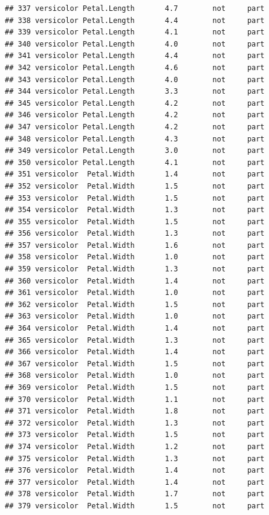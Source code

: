 \documentclass[krantz2]{krantz}\usepackage{knitr}%
\begin{document}
\begin{knitrout}
\begin{kframe}
\begin{verbatim}
## 337 versicolor Petal.Length       4.7        not     part
## 338 versicolor Petal.Length       4.4        not     part
## 339 versicolor Petal.Length       4.1        not     part
## 340 versicolor Petal.Length       4.0        not     part
## 341 versicolor Petal.Length       4.4        not     part
## 342 versicolor Petal.Length       4.6        not     part
## 343 versicolor Petal.Length       4.0        not     part
## 344 versicolor Petal.Length       3.3        not     part
## 345 versicolor Petal.Length       4.2        not     part
## 346 versicolor Petal.Length       4.2        not     part
## 347 versicolor Petal.Length       4.2        not     part
## 348 versicolor Petal.Length       4.3        not     part
## 349 versicolor Petal.Length       3.0        not     part
## 350 versicolor Petal.Length       4.1        not     part
## 351 versicolor  Petal.Width       1.4        not     part
## 352 versicolor  Petal.Width       1.5        not     part
## 353 versicolor  Petal.Width       1.5        not     part
## 354 versicolor  Petal.Width       1.3        not     part
## 355 versicolor  Petal.Width       1.5        not     part
## 356 versicolor  Petal.Width       1.3        not     part
## 357 versicolor  Petal.Width       1.6        not     part
## 358 versicolor  Petal.Width       1.0        not     part
## 359 versicolor  Petal.Width       1.3        not     part
## 360 versicolor  Petal.Width       1.4        not     part
## 361 versicolor  Petal.Width       1.0        not     part
## 362 versicolor  Petal.Width       1.5        not     part
## 363 versicolor  Petal.Width       1.0        not     part
## 364 versicolor  Petal.Width       1.4        not     part
## 365 versicolor  Petal.Width       1.3        not     part
## 366 versicolor  Petal.Width       1.4        not     part
## 367 versicolor  Petal.Width       1.5        not     part
## 368 versicolor  Petal.Width       1.0        not     part
## 369 versicolor  Petal.Width       1.5        not     part
## 370 versicolor  Petal.Width       1.1        not     part
## 371 versicolor  Petal.Width       1.8        not     part
## 372 versicolor  Petal.Width       1.3        not     part
## 373 versicolor  Petal.Width       1.5        not     part
## 374 versicolor  Petal.Width       1.2        not     part
## 375 versicolor  Petal.Width       1.3        not     part
## 376 versicolor  Petal.Width       1.4        not     part
## 377 versicolor  Petal.Width       1.4        not     part
## 378 versicolor  Petal.Width       1.7        not     part
## 379 versicolor  Petal.Width       1.5        not     part

\end{verbatim}
\end{kframe}
\end{knitrout}
\end{document}
